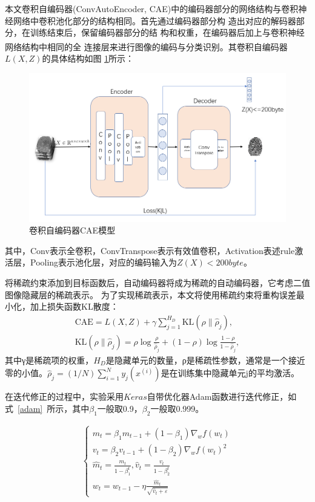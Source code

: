 \documentclass{whutmod}
\newcommand{\upcite}[1]{\textsuperscript{\cite{#1}}}
\begin{document}
			本文卷积自编码器(ConvAutoEncoder, CAE)中的编码器部分的网络结构与卷积神
			经网络中卷积池化部分的结构相同。首先通过编码器部分构
			造出对应的解码器部分，在训练结束后，保留编码器部分的结
			构和权重，在编码器后加上与卷积神经网络结构中相同的全
			连接层来进行图像的编码与分类识别\upcite{12,13}。其卷积自编码器$L(X,Z)$的具体结构如图
			\ref{labssel}所示：
					\begin{figure}[H]
				\centering
				\includegraphics[width=\textwidth]{figures/model.png}
				\caption{卷积自编码器CAE模型}\label{labssel}
			\end{figure}
		其中，Conv表示全卷积，ConvTranspose表示有效值卷积，Activation表述rule激活层，Pooling表示池化层，对应的编码输入为$Z(X)<200byte$。
		
	
					将稀疏约束添加到目标函数后，自动编码器将成为稀疏的自动编码器，它考虑二值图像隐藏层的稀疏表示。 为了实现稀疏表示，本文将使用稀疏约束将重构误差最小化，加上损失函数KL散度：
								\begin{gather}
					 \mathrm{CAE}=L(X, Z)+\gamma \sum_{j=1}^{H_{D}} \mathrm{KL}\left(\rho \| \hat{\rho}_{j}\right),\\
					 \mathrm{KL}\left(\rho \| \hat{\rho}_{j}\right)=\rho \log \frac{\rho}{\hat{\rho}_{j}}+(1-\rho) \log \frac{1-\rho}{1-\hat{\rho}_{j}},
								\end{gather}
					其中γ是稀疏项的权重，$H_D$是隐藏单元的数量，ρ是稀疏性参数，通常是一个接近零的小值。$\hat{\rho}_{j}=(1 / N) \sum_{i=1}^{N} y_{j}\left(x^{(i)}\right)$是在训练集中隐藏单元j的平均激活。

在迭代修正的过程中，实验采用$Keras$自带优化器Adam函数进行迭代修正，如式~\ref{adam}~所示，其中$\beta_{1}$一般取0.9，$\beta_{2}$一般取0.999。

\begin{gather*}\label{adam}
\left\{\begin{array}{l}{m_{t}=\beta_{1} m_{t-1}+\left(1-\beta_{1}\right) \nabla_{w} f\left(w_{t}\right)} \\ {v_{t}=\beta_{2} v_{t-1}+\left(1-\beta_{2}\right) \nabla_{w} f\left(w_{t}\right)^{2}} \\ {\widehat{m}_{t}=\frac{m_{t}}{1-\beta_{1}^{t}}, \hat{v}_{t}=\frac{v_{t}}{1-\beta_{2}^{t}}} \\ {w_{t}=w_{t-1}-\eta \frac{\widehat{m}_{t}}{\sqrt{\hat{v}_{t}+\varepsilon}}}\end{array}\right.
\end{gather*}
\end{document}
